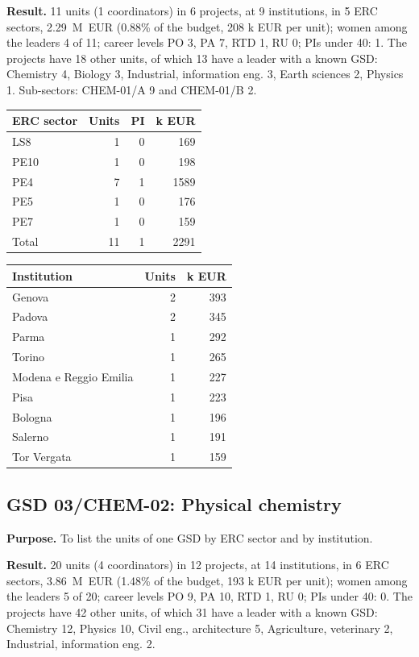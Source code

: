 \documentclass[11pt,a4paper]{article}
\begin{document}
\textbf{Result.} 11 units (1 coordinators) in 6 projects, at 9 institutions, in 5 ERC sectors, 2.29~M~EUR (0.88\% of the budget, 208 k EUR per unit); women among the leaders 4 of 11; career levels PO 3, PA 7, RTD 1, RU 0; PIs under 40: 1. The projects have 18 other units, of which 13 have a leader with a known GSD: Chemistry 4, Biology 3, Industrial, information eng. 3, Earth sciences 2, Physics 1. Sub-sectors: CHEM-01/A 9 and CHEM-01/B 2.

{\footnotesize
\begin{longtable}{lrrr}
\toprule
ERC sector & Units & PI & k EUR \\
\midrule
\endhead
LS8 & 1 & 0 & 169 \\
PE10 & 1 & 0 & 198 \\
PE4 & 7 & 1 & 1589 \\
PE5 & 1 & 0 & 176 \\
PE7 & 1 & 0 & 159 \\
\midrule
Total & 11 & 1 & 2291 \\
\bottomrule
\end{longtable}
}
{\footnotesize
\begin{longtable}{lrr}
\toprule
Institution & Units & k EUR \\
\midrule
\endhead
Genova & 2 & 393 \\
Padova & 2 & 345 \\
Parma & 1 & 292 \\
Torino & 1 & 265 \\
Modena e Reggio Emilia & 1 & 227 \\
Pisa & 1 & 223 \\
Bologna & 1 & 196 \\
Salerno & 1 & 191 \\
Tor Vergata & 1 & 159 \\
\bottomrule
\end{longtable}
}

\clearpage
\subsection{GSD 03/CHEM-02: Physical chemistry}
\textbf{Purpose.} To list the units of one GSD by ERC sector and by institution.

\textbf{Result.} 20 units (4 coordinators) in 12 projects, at 14 institutions, in 6 ERC sectors, 3.86~M~EUR (1.48\% of the budget, 193 k EUR per unit); women among the leaders 5 of 20; career levels PO 9, PA 10, RTD 1, RU 0; PIs under 40: 0. The projects have 42 other units, of which 31 have a leader with a known GSD: Chemistry 12, Physics 10, Civil eng., architecture 5, Agriculture, veterinary 2, Industrial, information eng. 2.
\end{document}

